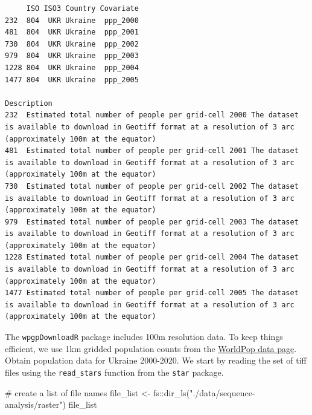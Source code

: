 \documentclass[
  letterpaper,
  DIV=11,
  numbers=noendperiod]{scrreprt}
\newenvironment{Shaded}{\begin{snugshade}}{\end{snugshade}}
\newcommand{\CommentTok}[1]{\textcolor[rgb]{0.37,0.37,0.37}{#1}}
\newcommand{\FunctionTok}[1]{\textcolor[rgb]{0.28,0.35,0.67}{#1}}
\newcommand{\NormalTok}[1]{\textcolor[rgb]{0.00,0.23,0.31}{#1}}
\newcommand{\OtherTok}[1]{\textcolor[rgb]{0.00,0.23,0.31}{#1}}
\newcommand{\SpecialCharTok}[1]{\textcolor[rgb]{0.37,0.37,0.37}{#1}}
\newcommand{\StringTok}[1]{\textcolor[rgb]{0.13,0.47,0.30}{#1}}
\begin{document}
\begin{verbatim}
     ISO ISO3 Country Covariate
232  804  UKR Ukraine  ppp_2000
481  804  UKR Ukraine  ppp_2001
730  804  UKR Ukraine  ppp_2002
979  804  UKR Ukraine  ppp_2003
1228 804  UKR Ukraine  ppp_2004
1477 804  UKR Ukraine  ppp_2005
                                                                                                                                                                 Description
232  Estimated total number of people per grid-cell 2000 The dataset is available to download in Geotiff format at a resolution of 3 arc (approximately 100m at the equator)
481  Estimated total number of people per grid-cell 2001 The dataset is available to download in Geotiff format at a resolution of 3 arc (approximately 100m at the equator)
730  Estimated total number of people per grid-cell 2002 The dataset is available to download in Geotiff format at a resolution of 3 arc (approximately 100m at the equator)
979  Estimated total number of people per grid-cell 2003 The dataset is available to download in Geotiff format at a resolution of 3 arc (approximately 100m at the equator)
1228 Estimated total number of people per grid-cell 2004 The dataset is available to download in Geotiff format at a resolution of 3 arc (approximately 100m at the equator)
1477 Estimated total number of people per grid-cell 2005 The dataset is available to download in Geotiff format at a resolution of 3 arc (approximately 100m at the equator)
\end{verbatim}

The \texttt{wpgpDownloadR} package includes 100m resolution data. To
keep things efficient, we use 1km gridded population counts from the
\href{https://hub.worldpop.org/geodata/listing?id=75}{WorldPop data
page}. Obtain population data for Ukraine 2000-2020. We start by reading
the set of tiff files using the \texttt{read\_stars} function from the
\texttt{star} package.

\begin{Shaded}
\begin{Highlighting}[]
\CommentTok{\# create a list of file names}
\NormalTok{file\_list }\OtherTok{\textless{}{-}}\NormalTok{ fs}\SpecialCharTok{::}\FunctionTok{dir\_ls}\NormalTok{(}\StringTok{"./data/sequence{-}analysis/raster"}\NormalTok{)}
\NormalTok{file\_list}
\end{Highlighting}
\end{Shaded}
\end{document}
